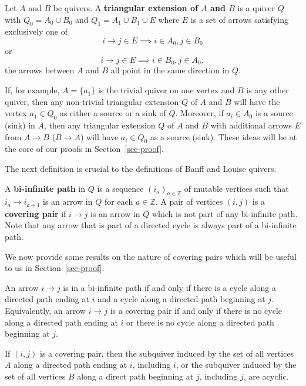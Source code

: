\documentclass[ALCO,Unicode]{cedram}
\newcommand{\ZZ}{\mathbb{Z}}
\begin{document}
\begin{defi}\label{def-triangular-extension}
    Let $A$ and $B$ be quivers. 
    A \textbf{triangular extension of $A$ and $B$} is a quiver $Q$ with $Q_0 = A_0 \cup B_0$ and $Q_1 = A_1 \cup B_1 \cup E$ where $E$ is a set of arrows satisfying exclusively one of
    $$i \to j \in E \implies i \in A_0, j \in B_0$$
    or 
    $$i \to j \in E \implies i \in B_0, j \in A_0,$$
    \ie the arrows between $A$ and $B$ all point in the same direction in $Q$.
\end{defi}

If, for example, $A = \{a_1\}$ is the trivial quiver on one vertex and $B$ is any other quiver, then any non-trivial triangular extension $Q$ of $A$ and $B$ will have the vertex $a_1 \in Q_0$ as either a source or a sink of $Q$. 
Moreover, if $a_i \in A_0$ is a source (\resp sink) in $A$, then any triangular extension $Q$ of $A$ and $B$ with additional arrows $E$ from $A \to B$ (\resp $B \to A$) will have $a_i \in Q_0$ as a source (\resp sink).
These ideas will be at the core of our proofs in Section~\ref{sec-proof}.

The next definition is crucial to the definitions of Banff and Louise quivers.

\begin{defi}\label{def-biinfitnite}
    A \textbf{bi-infinite path} in $Q$ is a sequence $(i_a)_{a \in \ZZ}$ of mutable vertices such that $i_a \to i_{a+1}$ is an arrow in $Q$ for each $a \in \ZZ$. 
    A pair of vertices $(i,j)$ is a \textbf{covering pair} if $i \to j$ is an arrow in $Q$ which is not part of any bi-infinite path.
    Note that any arrow that is part of a directed cycle is always part of a bi-infinite path.
 \end{defi}

 We now provide some results on the nature of covering pairs which will be useful to us in Section~\ref{sec-proof}.

\begin{prop}{\cite[Proposition 5.1]{MR2995670}} \label{prop-acyclic-covering-pair}
    An arrow $i \to j$ is in a bi-infinite path if and only if there is a cycle along a directed path ending at $i$ and a cycle along a directed path beginning at $j$.
    Equivalently, an arrow $i \to j$ is a covering pair if and only if there is no cycle along a directed path ending at $i$ or there is no cycle along a directed path beginning at $j$.
\end{prop}

\begin{coro} \label{cor-acyclic-covering-pair}
    If $(i,j)$ is a covering pair, then the subquiver induced by the set of all vertices $A$ along a directed path ending at $i$, including $i$, or the subquiver induced by the set of all vertices $B$ along a direct path beginning at $j$, including $j$, are acyclic.
\end{coro}
\end{document}
